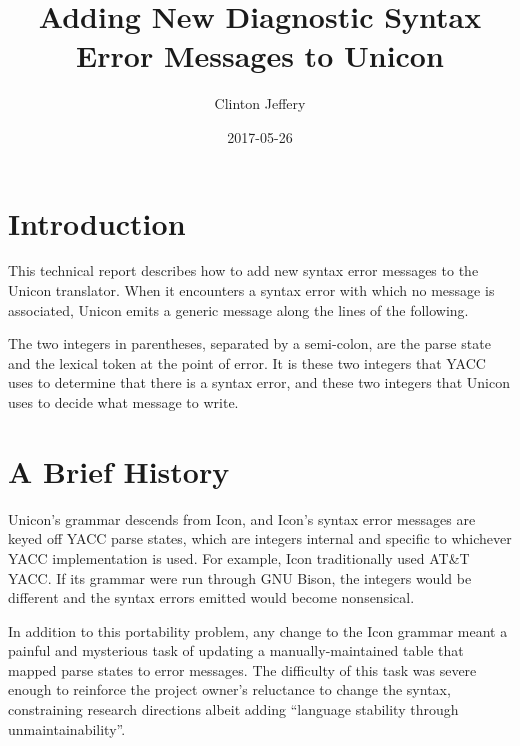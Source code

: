\documentclass[letterpaper]{article}
\title{Adding New Diagnostic Syntax Error Messages to Unicon}
\author{Clinton Jeffery}
\date{2017-05-26}
\begin{document}
\maketitle

\section{Introduction}

This technical report describes how to add new syntax error messages
to the Unicon translator. When it encounters a syntax error with which
no message is associated, Unicon emits a generic message along the
lines of the following.


The two integers in parentheses, separated by a semi-colon, are the parse
state and the lexical token at the point of error.  It is these two
integers that YACC uses to determine that there is a syntax error, and
these two integers that Unicon uses to decide what message to write.


\section{A Brief History}

Unicon's grammar descends from Icon, and Icon's syntax error messages
are keyed off YACC parse states, which are integers internal and
specific to whichever YACC implementation is used.  For example, Icon
traditionally used AT\&T YACC. If its grammar were run through GNU
Bison, the integers would be different and the syntax errors emitted
would become nonsensical.

In addition to this portability problem, any change to the
Icon grammar meant a painful and mysterious task of updating a
manually-maintained table that mapped parse states to error messages.
The difficulty of this task was severe enough to reinforce the
project owner's reluctance to change the syntax, constraining research
directions albeit adding ``language stability through unmaintainability''.
\end{document}
